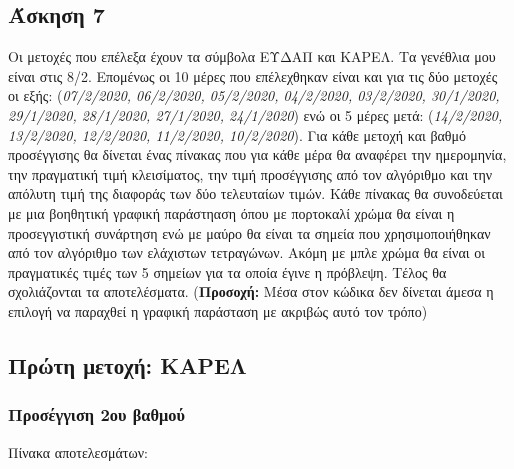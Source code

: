 \documentclass[a4paper,11pt]{article}
\begin{document}
	\subsection{Άσκηση 7}\label{ux3acux3c3ux3baux3b7ux3c3ux3b7-7}
	
	Οι μετοχές που επέλεξα έχουν τα σύμβολα ΕΥΔΑΠ και ΚΑΡΕΛ. Τα γενέθλια μου
	είναι στις 8/2. Επομένως οι 10 μέρες που επέλεχθηκαν είναι και για τις
	δύο μετοχές οι εξής: (\emph{07/2/2020, 06/2/2020, 05/2/2020, 04/2/2020,
	03/2/2020, 30/1/2020, 29/1/2020, 28/1/2020, 27/1/2020, 24/1/2020}) ενώ
	οι 5 μέρες μετά: (\emph{14/2/2020, 13/2/2020, 12/2/2020, 11/2/2020,
	10/2/2020}). Για κάθε μετοχή και βαθμό προσέγγισης θα δίνεται ένας πίνακας που για κάθε μέρα θα αναφέρει την ημερομηνία, την πραγματική τιμή κλεισίματος, την τιμή προσέγγισης από τον αλγόριθμο και την απόλυτη τιμή της διαφοράς των δύο τελευταίων τιμών. Κάθε πίνακας θα συνοδεύεται με μια βοηθητική γραφική παράστηαση όπου με πορτοκαλί χρώμα θα είναι η προσεγγιστική συνάρτηση ενώ με μαύρο θα είναι τα σημεία που χρησιμοποιήθηκαν από τον αλγόριθμο των ελάχιστων τετραγώνων. Ακόμη με μπλε χρώμα θα είναι οι πραγματικές τιμές των 5 σημείων για τα οποία έγινε η πρόβλεψη. Τέλος θα σχολιάζονται τα αποτελέσματα. (\textbf{Προσοχή:} Μέσα στον κώδικα δεν δίνεται άμεσα η επιλογή να παραχθεί η γραφική παράσταση με ακριβώς αυτό τον τρόπο)
	
	\subsection{Πρώτη μετοχή:
	ΚΑΡΕΛ}\label{ux3c0ux3c1ux3ceux3c4ux3b7-ux3bcux3b5ux3c4ux3bfux3c7ux3ae-ux3baux3b1ux3c1ux3b5ux3bb}
	
	\subsubsection{Προσέγγιση 2ου βαθμού}

	Πίνακα αποτελεσμάτων:
\end{document}
